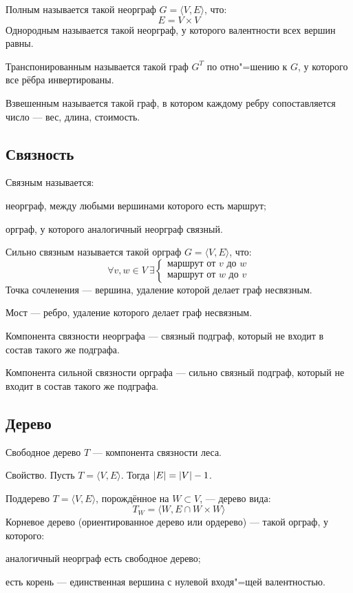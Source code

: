 {\bold Полным} называется такой неорграф $G=\langle V,E\rangle$, что:
$$E=V\times V$$
{\bold Однородным} называется такой неорграф, у которого {\ital валентности} всех вершин равны.

{\bold Транспонированным} называется такой граф $G^T$ по отно"=шению к $G$, у которого все рёбра {\ital инвертированы}.

{\bold Взвешенным} называется такой граф, в котором каждому ребру сопоставляется число --- {\ital вес, длина, стоимость}.

\subsection{Связность}

{\bold Связным} называется:
\begin{list*}
\item{\ital неорграф}, между любыми вершинами которого есть маршрут;
\item{\ital орграф}, у которого аналогичный неорграф {\ital связный}.
\end{list*}
{\bold Сильно связным} называется такой {\ital орграф} $G=\langle V,E\rangle$, что:
$$\forall v,w\in V\ \exists
\begin{cases}
\text{маршрут от }v\text{ до }w\\
\text{маршрут от }w\text{ до }v
\end{cases}$$
{\bold Точка сочленения} --- вершина, удаление которой делает граф {\ital несвязным}.

{\bold Мост} --- ребро, удаление которого делает граф {\ital несвязным}.

{\bold Компонента связности} {\ital неорграфа} --- связный подграф, который не входит в состав такого же подграфа.

{\bold Компонента сильной связности} {\ital орграфа} --- сильно связный подграф, который не входит в состав такого же подграфа.

\subsection{Дерево}

{\bold Свободное дерево} $T$ --- компонента связности леса.
\begin{theorem}
{\bold Свойство.} Пусть $T=\langle V,E\rangle$. Тогда $\left|E\right|=\left|V\right|-1$.
\end{theorem}
{\bold Поддерево} $T=\langle V,E\rangle$, {\ital порождённое} на $W\subset V$, --- дерево вида:
$$T_W=\langle W,E\cap W\times W\rangle$$
{\bold Корневое дерево} {\ital (ориентированное дерево или ордерево)} --- такой орграф, у которого:
\begin{list*}
\item аналогичный неорграф есть свободное дерево;
\item есть {\bold корень} --- единственная вершина с нулевой входя"=щей валентностью.
\end{list*}

